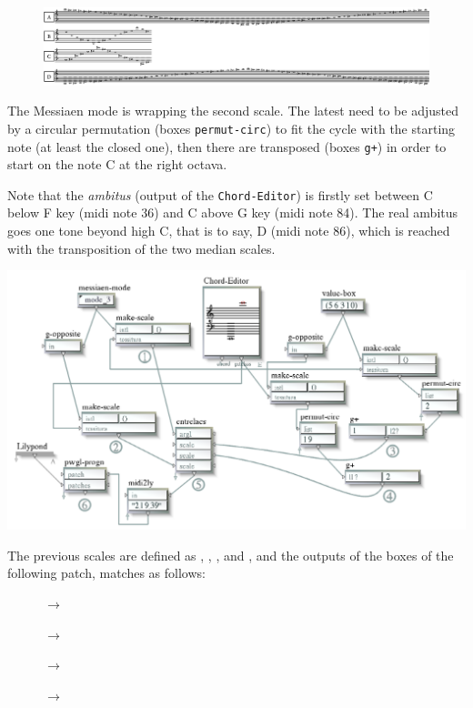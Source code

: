 \begin{figure}[htbp]
\begin{center}
\includegraphics[width=\textwidth]{mp/img/scale}
\end{center}
\end{figure}

The Messiaen mode is wrapping the second scale. The latest need to be adjusted by a circular permutation (boxes \texttt{permut-circ}) to fit the cycle with the starting note (at least the closed one), then there are transposed (boxes \texttt{g+}) in order to start on the note C at the right octava. 

Note that the \textit{ambitus} (output of the \texttt{Chord-Editor}) is firstly set between C below F key (midi note 36) and C above G key (midi note 84). The real ambitus goes one tone beyond high C, that is to say, D (midi note 86), which is reached with the transposition of the two median scales.

{
\begin{center}
\includegraphics[width=\textwidth]{mp/img/patch}
\end{center}
} 

The previous scales are defined as \textcolor{gray}{}, \textcolor{gray}{}, \textcolor{gray}{}, and \textcolor{gray}{}, and the outputs of the boxes of the following patch, matches as follows:

\begin{description}
\item[ ] \textcolor{gray}{} $\rightarrow$ \textcolor{gray}{}
\item[ ] \textcolor{gray}{} $\rightarrow$ \textcolor{gray}{}
\item[ ] \textcolor{gray}{} $\rightarrow$ \textcolor{gray}{}
\item[ ] \textcolor{gray}{} $\rightarrow$ \textcolor{gray}{}
\end{description}

